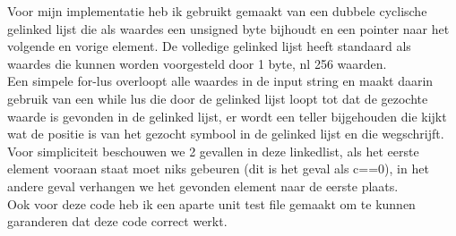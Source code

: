 \documentclass[10pt,a4paper]{report}
\begin{document}
Voor mijn implementatie heb ik gebruikt gemaakt van een dubbele cyclische gelinked lijst die als waardes een unsigned byte bijhoudt en een pointer naar het volgende en vorige element. De volledige  gelinked lijst heeft standaard als waardes die kunnen worden voorgesteld door 1 byte, nl 256 waarden.\\ 
Een simpele for-lus overloopt alle waardes in de input string en maakt daarin gebruik van een while lus die door de gelinked lijst loopt tot dat de gezochte waarde is gevonden in de gelinked lijst, er wordt een teller bijgehouden die kijkt wat de positie is van het gezocht symbool in de gelinked lijst en die wegschrijft.\\

Voor simpliciteit beschouwen we 2 gevallen in deze linkedlist, als het eerste element vooraan staat moet niks gebeuren (dit is het geval als c==0), in het andere geval verhangen we het gevonden element naar de eerste plaats.\\

Ook voor deze code heb ik een aparte unit test file gemaakt om te kunnen garanderen dat deze code correct werkt. 
\end{document}

